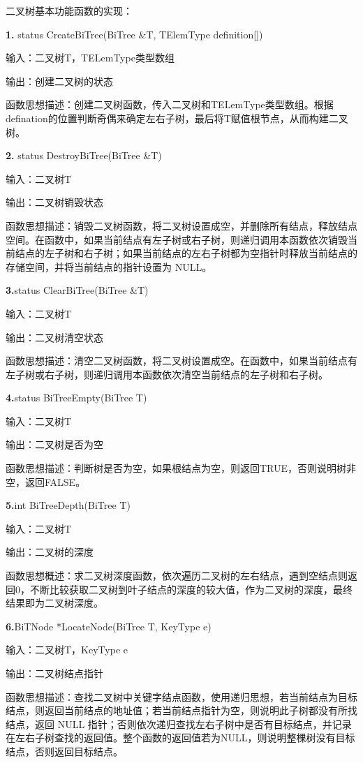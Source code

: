 \documentclass[supercite]{Experimental_Report}
\theoremstyle{definition}
\begin{document}
\setcounter{paragraph}{0}

二叉树基本功能函数的实现：

\noindent\textbf{ 1.} status CreateBiTree(BiTree \&T, TElemType definition[])

输入：二叉树T，TELemType类型数组

输出：创建二叉树的状态

函数思想描述：创建二叉树函数，传入二叉树和TELemType类型数组。根据defination的位置判断奇偶来确定左右子树，最后将T赋值根节点，从而构建二叉树。

\noindent\textbf{ 2.} status DestroyBiTree(BiTree \&T)
    
输入：二叉树T

输出：二叉树销毁状态

函数思想描述：销毁二叉树函数，将二叉树设置成空，并删除所有结点，释放结点空间。在函数中，如果当前结点有左子树或右子树，则递归调用本函数依次销毁当前结点的左子树和右子树；如果当前结点的左右子树都为空指针时释放当前结点的存储空间，并将当前结点的指针设置为 NULL。

\noindent\textbf{ 3.}status ClearBiTree(BiTree \&T)
    
输入：二叉树T

输出：二叉树清空状态

函数思想描述：清空二叉树函数，将二叉树设置成空。在函数中，如果当前结点有左子树或右子树，则递归调用本函数依次清空当前结点的左子树和右子树。

\noindent\textbf{ 4.}status BiTreeEmpty(BiTree T)

输入：二叉树T

输出：二叉树是否为空

函数思想描述：判断树是否为空，如果根结点为空，则返回TRUE，否则说明树非空，返回FALSE。

\noindent\textbf{ 5.}int BiTreeDepth(BiTree T)

输入：二叉树T

输出：二叉树的深度

函数思想概述：求二叉树深度函数，依次遍历二叉树的左右结点，遇到空结点则返回0，不断比较获取二叉树到叶子结点的深度的较大值，作为二叉树的深度，最终结果即为二叉树深度。

\noindent\textbf{ 6.}BiTNode *LocateNode(BiTree T, KeyType e)

输入：二叉树T，KeyType e

输出：二叉树结点指针

函数思想描述：查找二叉树中关键字结点函数，使用递归思想，若当前结点为目标结点，则返回当前结点的地址值；若当前结点指针为空，则说明此子树都没有所找结点，返回 NULL 指针；否则依次递归查找左右子树中是否有目标结点，并记录在左右子树查找的返回值。整个函数的返回值若为NULL，则说明整棵树没有目标结点，否则返回目标结点。
\end{document}
